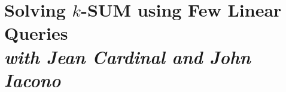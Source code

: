 \chapter%
[Solving $k$-SUM using Few Linear Queries]%
{Solving $k$-SUM using Few Linear Queries\\[1ex]
\normalfont\footnotesize\itshape with Jean Cardinal and John Iacono}%
\label{paper:ksum-algorithm}




